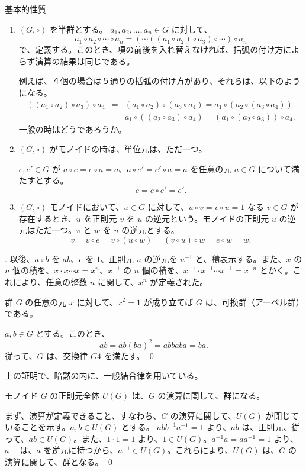 基本的性質
\begin{enumerate}
\item $(G,\circ)$ を半群とする。 $a_1, a_2, \ldots, a_n\in G$ に対して、
$$a_1\circ a_2\circ \cdots \circ a_n = (\cdots ((a_1\circ a_2)\circ a_3)\circ \cdots )\circ a_n$$
で、定義する。このとき、項の前後を入れ替えなければ、括弧の付け方によらず演算の結果は同じである。

例えば、４個の場合は５通りの括弧の付け方があり、それらは、以下のようになる。
\begin{eqnarray*}
((a_1\circ a_2)\circ a_3)\circ a_4 & = & (a_1\circ a_2)\circ (a_3\circ a_4) = a_1\circ(a_2\circ(a_3\circ a_4))\\
& = & a_1\circ((a_2\circ a_3)\circ a_4) = (a_1\circ(a_2\circ a_3))\circ a_4.
\end{eqnarray*}
一般の時はどうであろうか。

\item $(G, \circ)$ がモノイドの時は、単位元は、ただ一つ。

$e, e'\in G$ が $a\circ e = e\circ a = a$、$a\circ e' = e'\circ a = a$ を任意の元 $a\in G$ について満たすとする。
$$e = e\circ e' = e'.$$

\item $(G, \circ)$ モノイドにおいて、$u\in G$ に対して、$u\circ v = v\circ u = 1$ なる $v\in G$ が存在するとき、$u$ を正則元 $v$ を $u$ の逆元という。モノイドの正則元 $u$ の逆元はただ一つ。$v$ と $w$ を $u$ の逆元とする。
$$v = v\circ e = v\circ (u\circ w) = (v\circ u)\circ w = e\circ w = w.$$
\end{enumerate}
.
以後、$a\circ b$ を $ab$、$e$ を $1$、正則元 $u$  の逆元を $u^{-1}$ と、積表示する。また、$x$ の $n$ 個の積を、$x\cdot x\cdots x = x^n$、$x^{-1}$ の $n$ 個の積を、$x^{-1}\cdot x^{-1}\cdots x^{-1} = x^{-n}$ とかく。これにより、任意の整数 $n$ に関して、$x^n$ が定義された。

\begin{prop} \label{prop:x2=1}
群 $G$ の任意の元 $x$ に対して、$x^2 = 1$ が成り立てば $G$ は、可換群（アーベル群）である。
\end{prop}
\proof
$a, b\in G$ とする。このとき、
$$ab = ab(ba)^2 = abbaba = ba.$$
従って、$G$ は、交換律 $G4$ を満たす。
\qed

\medskip
\note
上の証明で、暗黙の内に、一般結合律を用いている。

\begin{prop} \label{prop:unitgroup}
モノイド $G$ の正則元全体 $U(G)$  は、$G$ の演算に関して、群になる。
\end{prop}
\proof
まず、演算が定義できること、すなわち、$G$ の演算に関して、$U(G)$ が閉じていることを示す。$a, b\in U(G)$ とする。
$abb^{-1}a^{-1} = 1$ より、$ab$ は、正則元、従って、$ab\in U(G)$。また、$1\cdot 1 = 1$ より、$1\in U(G)$。$a^{-1} a = aa^{-1} = 1$  より、$a^{-1}$ は、$a$ を逆元に持つから、$a^{-1}\in U(G)$。これらにより、$U(G)$  は、$G$ の演算に関して、群となる。
\qed

